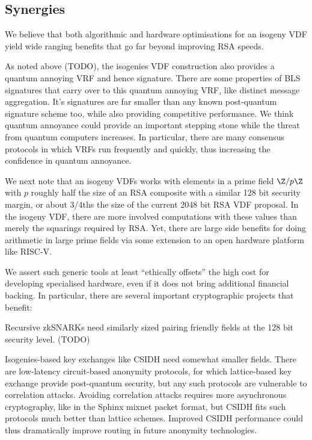 \documentclass{article}
\begin{document}
\subsection{Synergies}

We believe that both algorithmic and hardware optimisations for an
isogeny VDF yield wide ranging benefits that go far beyond improving
RSA speeds.

As noted above (TODO), the isogenies VDF construction also provides a
quantum annoying VRF and hence signature.  There are some properties
of BLS signatures that carry over to this quantum annoying VRF, like
distinct message aggregation.  It's signatures are far smaller than
any known post-quantum signature scheme too, while also providing
competitive performance.  We think quantum annoyance could provide
an important stepping stone while the threat from quantum computers
increases.  In particular, there are many consensus protocols in which
VRFs run frequently and quickly, thus increasing the confidence in
quantum annoyance.  

We next note that an isogeny VDFs works with elements in a prime
field $\Z/p\Z$ with $p$ roughly half the size of an RSA composite
with a similar 128 bit security margin, or about 3/4ths the size of
the current 2048 bit RSA VDF proposal.  
In the isogeny VDF, there are more involved computations with
these values than merely the squarings required by RSA.  
Yet, there are large side benefits for doing arithmetic in large prime
fields via some extension to an open hardware platform like RISC-V.

We assert such generic tools at least ``ethically offsets'' the
high cost for developing specialised hardware, even if it does not
bring additional financial backing.  In particular, there are several
important cryptographic projects that benefit: 

Recursive zkSNARKs need similarly sized pairing friendly fields at
the 128 bit security level.  (TODO)

Isogenies-based key exchanges like CSIDH need somewhat smaller fields.
There are low-latency circuit-based anonymity protocols, 
for which lattice-based key exchange provide post-quantum security,
but any such protocols are vulnerable to correlation attacks. 
Avoiding correlation attacks requires more asynchronous cryptography,
like in the Sphinx mixnet packet format, but CSIDH fits such protocols
much better than lattice schemes.  Improved CSIDH performance could
thus dramatically improve routing in future anonymity technologies.
\end{document}
